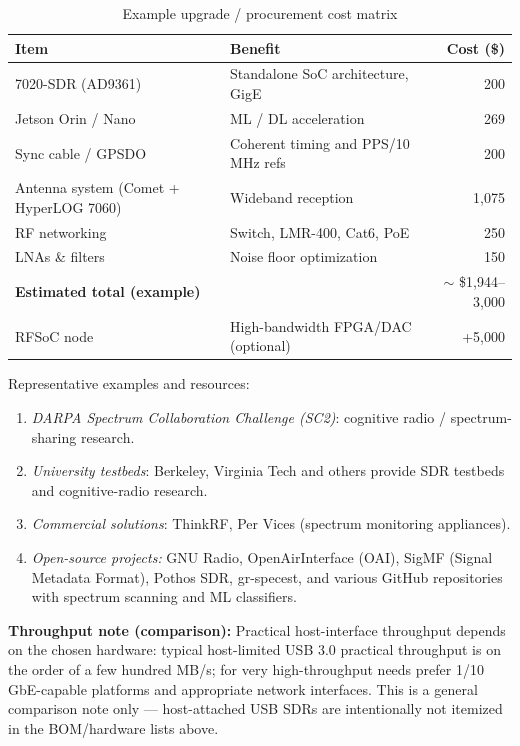 \documentclass[11pt]{report}
\newcommand{\gc}[1]{\textcolor[rgb]{1.00,0.00,0.00}{#1}} %
\newcommand{\blue}[1]{\textcolor[rgb]{0.00,0.00,1.00}{#1}} %
\begin{document}
\begin{description}
\begin{table}[h]
    \centering
    \begin{tabular}{@{}l p{7.2cm} r@{}}
        \toprule
        \textbf{Item} & \textbf{Benefit} & \textbf{Cost (\$)} \\
        \midrule
        7020-SDR (AD9361) & Standalone SoC architecture, GigE & 200 \\
        Jetson Orin / Nano & ML / DL acceleration & 269 \\
        Sync cable / GPSDO & Coherent timing and PPS/10 MHz refs & 200 \\
        Antenna system (Comet + HyperLOG 7060) & Wideband reception & 1,075 \\
        RF networking & Switch, LMR-400, Cat6, PoE & 250 \\
        LNAs \& filters & Noise floor optimization & 150 \\
        \textbf{Estimated total (example)} & & $\sim$ \blue{\$1,944--3,000} \\
        \midrule
        RFSoC node & High-bandwidth FPGA/DAC (optional) & \gc{+5,000} \\
        \bottomrule
    \end{tabular}
    \caption{Example upgrade / procurement cost matrix}
\end{table}

\vspace{6pt}

\item[Similar projects \& references:] Representative examples and resources:
\begin{enumerate}[label=\roman*)]
    \item \emph{DARPA Spectrum Collaboration Challenge (SC2)}: cognitive radio / spectrum-sharing research.
    \item \emph{University testbeds}: Berkeley, Virginia Tech and others provide SDR testbeds and cognitive-radio research.
    \item \emph{Commercial solutions}: ThinkRF, Per Vices (spectrum monitoring appliances).
    \item \emph{Open-source projects:} GNU Radio, OpenAirInterface (OAI), SigMF (Signal Metadata Format), Pothos SDR, gr-specest, and various GitHub repositories with spectrum scanning and ML classifiers.
\end{enumerate}

\vspace{8pt}

\noindent\textbf{Throughput note (comparison):} Practical host-interface throughput depends on the chosen hardware: typical host-limited USB 3.0 practical throughput is on the order of a few hundred MB/s; for very high-throughput needs prefer 1/10\,GbE-capable platforms and appropriate network interfaces. This is a general comparison note only — host-attached USB SDRs are intentionally not itemized in the BOM/hardware lists above.


\end{description}
\end{document}
